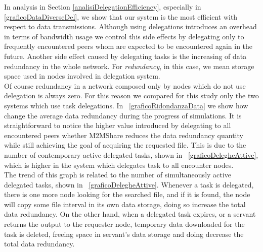 In analysis in Section \ref{analisiDelegationEfficiency}, especially in \figurename~ \ref{graficoDataDiverseDel}, we show that our system is the most efficient with respect to data transmissions. Although using delegations introduces an overhead in terms of bandwidth usage we control this side effects by delegating only to frequently encountered peers whom are expected to be encountered again in the future. Another side effect caused by delegating tasks is the increasing of data redundancy in the whole network. For \textit{redundancy}, in this case, we mean storage space used in nodes involved in delegation system. 
\\ 

Of course redundancy in a network composed only by nodes which do not use delegation is always zero. For this reason we compared for this study only the two systems which use task delegations. In \figurename~\ref{graficoRidondanzaData} we show how change the average data redundancy during the progress of simulations. It is straightforward to notice the higher value introduced by delegating to all encountered peers whether M2MShare reduces the data redundancy quantity while still achieving the goal of acquiring the requested file. This is due to the number of contemporary active delegated tasks, shown in \figurename~\ref{graficoDelegheAttive}, which is higher in the system which delegates task to all encounter nodes. 
\\
The trend of this graph is related to the number of simultaneously active delegated tasks, shown in \figurename~\ref{graficoDelegheAttive}. Whenever a task is delegated, there is one more node looking for the searched file, and if it is found, the node will copy some file interval in its own data storage, doing so increase the total data redundancy. On the other hand, when a delegated task expires, or a servant returns the output to the requester node, temporary data downloaded for the task is deleted, freeing space in servant's data storage and doing decrease the total data redundancy.

